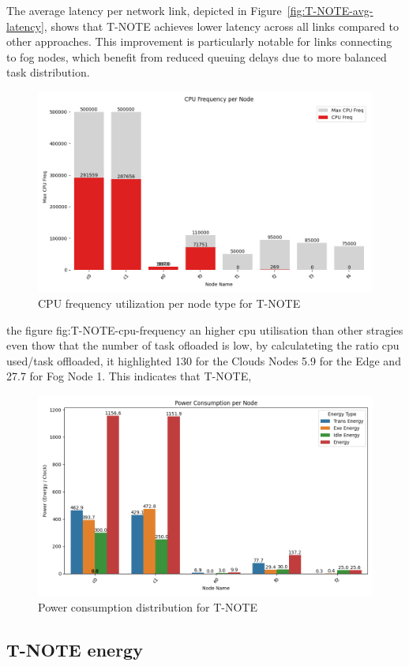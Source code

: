 \documentclass[preprint,3p,authoryear]{elsarticle}
\begin{document}
The average latency per network link, depicted in Figure~\ref{fig:T-NOTE-avg-latency}, shows that T-NOTE achieves lower latency across all links compared to other approaches. This improvement is particularly notable for links connecting to fog nodes, which benefit from reduced queuing delays due to more balanced task distribution.



\begin{figure}[H]
    \centering
    \includegraphics[width=0.5\linewidth]{figs/T-NOTE/cpu_frequency_per_node.png}
    \caption{CPU frequency utilization per node type for T-NOTE}
    \label{fig:T-NOTE-cpu-frequency}
\end{figure}

the figure fig:T-NOTE-cpu-frequency an higher cpu utilisation than other stragies even thow that the number of task ofloaded is low, by calculateting the ratio cpu used/task offloaded, it highlighted 130 for the Clouds Nodes 5.9 for the Edge and 27.7 for Fog Node 1. This indicates that T-NOTE, 



\begin{figure}[H]
    \centering
    \includegraphics[width=0.5\linewidth]{figs/T-NOTE/power_consumption_per_node.png}
    \caption{Power consumption distribution for T-NOTE}
    \label{fig:T-NOTE-power-consumption}
\end{figure}



\subsection{T-NOTE energy }
\end{document}
